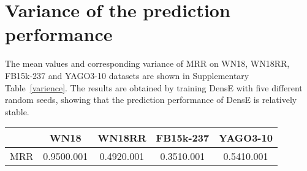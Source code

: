\documentclass[11pt]{article}
\begin{document}
\section{Variance of the prediction performance}

The mean values and corresponding variance of MRR on WN18, WN18RR, FB15k-237 and YAGO3-10 datasets are shown in Supplementary Table~\ref{varience}. The results are obtained by training DensE with five different random seeds, showing that the prediction performance of DensE is relatively stable. 

\begin{table*}[!h]
\centering
\caption{The mean values and variance of MRR on WN18, WN18RR, FB15k-237 and YAGO3-10 datasets.}

 \begin{tabular}{ l c c c c  }
  \toprule
   ~ & WN18 & WN18RR & FB15k-237  & YAGO3-10 \\  
  \midrule
  MRR  & 0.9500.001    & 0.4920.001  & 0.3510.001   & 0.5410.001  \\ 
 \bottomrule
\end{tabular} 
\label{varience}
\end{table*}







\end{document}
